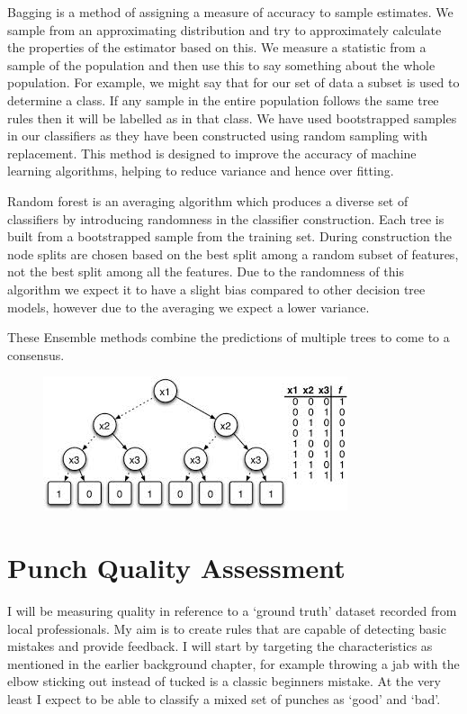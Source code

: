 Bagging is a method of assigning a measure of accuracy to sample estimates. We sample from an approximating distribution and try to approximately calculate the
properties of the estimator based on this. We measure a statistic from a sample of the population and then use this to say something about the whole population. For example, we might say that for our set of data a subset is used to determine a class. If any sample in the entire population follows the same tree rules then it will be labelled as in that class. We have used bootstrapped samples in our classifiers as they have been constructed using random sampling with replacement. 
This method is designed to improve the accuracy of machine learning algorithms, helping to reduce variance and hence over fitting. 

Random forest is an averaging algorithm which produces a diverse set of classifiers by introducing randomness in the classifier construction. Each tree is built from a bootstrapped sample from the training set. During construction the node splits are chosen based on the best split among a random subset of features, not the best split among all the features. Due to the randomness of this algorithm we expect it to have a slight bias compared to other decision tree models, however due to the averaging we expect a lower variance.

These Ensemble methods combine the predictions of multiple trees to come to a consensus.

\begin{figure}[h]
    \centering
    \includegraphics[height=0.25\textheight]{fig02/dtree}
    \label{fig:kinect}
\end{figure}


\section{Punch Quality Assessment}
I will be measuring quality in reference to a `ground truth' dataset
recorded from local professionals. My aim is to create rules that are capable of detecting basic mistakes and provide feedback. I will start by targeting the characteristics as mentioned in the earlier background chapter, for example throwing a jab with the elbow sticking out instead of tucked is a classic beginners mistake. At the very least I expect to be able to classify a mixed set of punches as `good' and `bad'.

